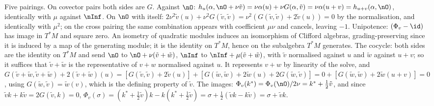 Five pairings. On covector pairs both sides are $G$. Against $\nO$: $h_u(\alpha, \nO + \nu\tilde v) = \nu\alpha(u) + \nu G(\alpha, \tilde v) = \nu\alpha(u + v) = h_{u+v}(\alpha, \nO)$, identically with $\mu$ against $\nInf$. On $\nO$ with itself: $2\nu^2\tilde v(u) + \nu^2 G(\tilde v, \tilde v) = \nu^2(G(\tilde v, \tilde v) + 2\tilde v(u)) = 0$ by the normalisation, and identically with $\mu^2$; on the cross pairing the same combination appears with coefficient $\mu\nu$ and cancels, leaving $-1$. Unipotence: $(\Phi_v - \id)$ has image in $T^*M$ and square zero. An isometry of quadratic modules induces an isomorphism of Clifford algebras, grading-preserving since it is induced by a map of the generating module; it is the identity on $T^*M$, hence on the subalgebra $T^*M$ generates. The cocycle: both sides are the identity on $T^*M$ and send $\nO$ to $\nO + \nu(\tilde v + \tilde w)$, $\nInf$ to $\nInf + \mu(\tilde v + \tilde w)$, with $\tilde v$ normalised against $u$ and $\tilde w$ against $u + v$; so it suffices that $\tilde v + \tilde w$ is the representative of $v + w$ normalised against $u$. It represents $v + w$ by linearity of the solve, and $G(\tilde v + \tilde w, \tilde v + \tilde w) + 2(\tilde v + \tilde w)(u) = [G(\tilde v, \tilde v) + 2\tilde v(u)] + [G(\tilde w, \tilde w) + 2\tilde w(u) + 2G(\tilde w, \tilde v)] = 0 + [G(\tilde w, \tilde w) + 2\tilde w(u + v)] = 0$, using $G(\tilde w, \tilde v) = \tilde w(v)$, which is the defining property of $\tilde v$. The images: $\Phi_v(k^*) = \Phi_v(\nO)/2\nu = k^* + \tfrac12\tilde v$, and since $\tilde v k + k\tilde v = 2G(\tilde v, k) = 0$, $\Phi_v(\sigma) = (k^* + \tfrac12\tilde v)k - k(k^* + \tfrac12\tilde v) = \sigma + \tfrac12(\tilde v k - k\tilde v) = \sigma + \tilde v k$.
